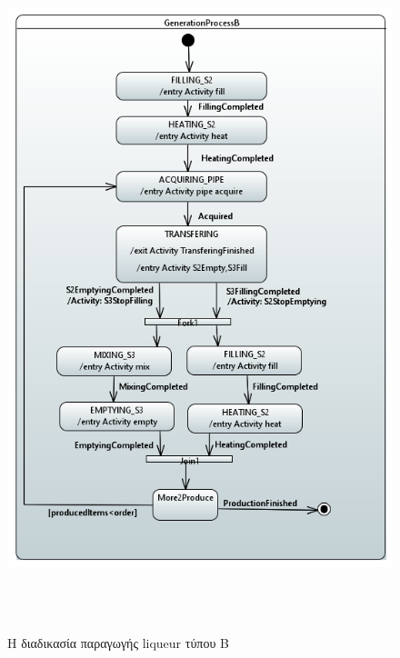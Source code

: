 \begin{figure}[htbp]
	\centering
		\includegraphics[height=20cm,width=14cm]{Figures/26.PNG}
	\caption{Η διαδικασία παραγωγής liqueur τύπου Β}	
\end{figure}